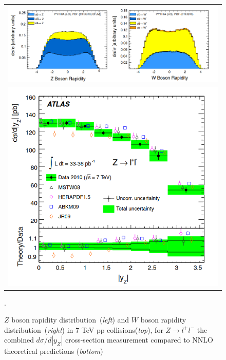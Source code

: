 \begin{figure}[H]
\centering
\begin{tabular}{c}
\includegraphics[scale=0.44]{chapter3/rapidity.png} \\
\includegraphics[scale=0.44]{chapter3/atlas-rapidity.png}
\end{tabular}
\caption{$Z$ boson rapidity distribution~(\textit{left}) and $W$ boson rapidity distribution~(\textit{right}) in 7 TeV pp collisions(\textit{top}), for $Z\rightarrow l^{+}l^{-}$ the combined $d\sigma/d|y_{Z}|$ cross-section measurement compared to NNLO theoretical predictions (\textit{bottom})~ \cite{Schott_2014}}.
\label{raptdity-atlas}
\end{figure} 


